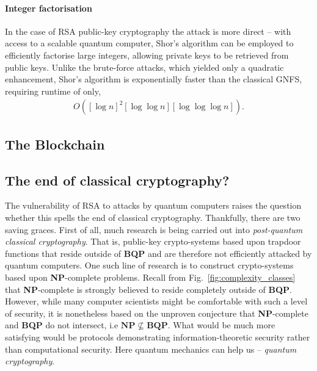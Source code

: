 \paragraph{Integer factorisation}

In the case of RSA public-key cryptography the attack is more direct -- with access to a scalable quantum computer, Shor's algorithm can be employed to efficiently factorise large integers, allowing private keys to be retrieved from public keys. Unlike the brute-force attacks, which yielded only a quadratic enhancement, Shor's algorithm is exponentially faster than the classical GNFS, requiring runtime of only,
\begin{align}
	O([\log n]^2[\log\log n][\log\log\log n]).
\end{align}

\subsection{The Blockchain}

\subsection{The end of classical cryptography?}

The vulnerability of RSA to attacks by quantum computers raises the question whether this spells the end of classical cryptography. Thankfully, there are two saving graces. First of all, much research is being carried out into \textit{post-quantum classical cryptography}. That is, public-key crypto-systems based upon trapdoor functions that reside outside of \textbf{BQP} and are therefore not efficiently attacked by quantum computers. One such line of research is to construct crypto-systems based upon \textbf{NP}-complete problems. Recall from Fig.~\ref{fig:complexity_classes} that \textbf{NP}-complete is strongly believed to reside completely outside of \textbf{BQP}. However, while many computer scientists might be comfortable with such a level of security, it is nonetheless based on the unproven conjecture that \textbf{NP}-complete and \textbf{BQP} do not intersect, i.e \mbox{$\mathbf{NP}\nsubseteq\mathbf{BQP}$}. What would be much more satisfying would be protocols demonstrating information-theoretic security rather than computational security. Here quantum mechanics can help us -- \textit{quantum cryptography}.


